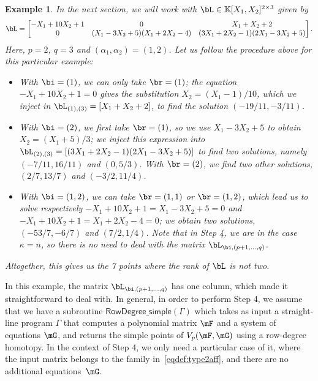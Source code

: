 \documentclass[12pt]{article}
\newtheorem{example}[definition]{Example}
\begin{document}
\begin{example}\label{ex:N}
  In the next section, we will work with $\bL \in \K[X_1,X_2]^{2\times 3}$ given by
$$\bL = \left [\begin{matrix}
-X_1 + 10 X_2 + 1 & 0 & X_1+X_2 + 2\\
  0 & (X_1-3X_2+5)(X_1 + 2 X_2 - 4) & (3X_1 +2 X_2-1)(2X_1 -3X_2 +5)
    \end{matrix} \right ].$$
  Here, $p=2$, $q=3$ and $(\alpha_1,\alpha_2)=(1,2)$.
  Let us follow the procedure above for this particular example:
  \begin{itemize}
  \item With $\bi=(1)$, we can only take $\br = (1)$; the equation
    $-X_1 + 10 X_2 + 1=0$ gives the substitution $X_2=(X_1-1)/10$,
    which we inject in $\bL_{(1),(3)} = [ X_1+X_2 + 2 ]$, to find the 
    solution $(-19/11, -3/11)$.
  \item With $\bi=(2)$, we first take $\br=(1)$, so we use
    $X_1-3X_2+5$ to obtain $X_2 = (X_1+5)/3$; we inject this expression into
    $\bL_{(2),(3)}=[(3X_1 +2 X_2-1)(2X_1 -3X_2 +5)]$ to find two solutions, namely
    $(-7/11, 16/11)$ and $(0, 5/3)$. With $\br =(2)$, we find two
    other solutions, $(2/7, 13/7)$ and $(-3/2, 11/4)$.
  \item With $\bi=(1,2)$, we can take $\br=(1,1)$ or $\br=(1,2)$,
    which lead us to solve respectively $-X_1 + 10 X_2 +
    1=X_1-3X_2+5=0$ and $-X_1 + 10 X_2 + 1=X_1 + 2 X_2 - 4=0$; we
    obtain two solutions, $(-53/7, -6/7)$ and $(7/2, 1/4)$. Note that
    in Step 4, we are in the case $\kappa = n$, so there is no need to
    deal with the matrix $\bL_{\bi,(p+1, \ldots, q)}$.
  \end{itemize}
  Altogether, this gives us the 7 points where the rank of $\bL$ is
  not two.
\end{example}

In this example, the matrix $\bL_{\bi,(p+1, \ldots, q)}$ has one column,
which made it straightforward to deal with. In general, in order to
perform Step 4, we assume that we have a subroutine
$\mathsf{RowDegree\_simple}(\Gamma)$ which takes as input a
straight-line program $\Gamma$ that computes a polynomial matrix $\mF$
and a system of equations $\mG$, and returns the simple points of
$V_p(\mF,\mG)$ using a row-degree homotopy. In the context of Step 4,
we only need a particular case of it, where the input matrix belongs
to the family in~\eqref{eqdef:type2aff}, and there are no additional
equations~$\mG$.
\end{document}
